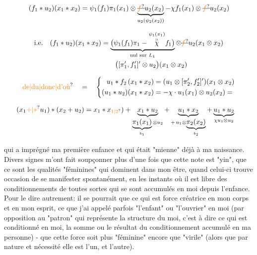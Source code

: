 \[
(f_1\ast u_2)(x_1\ast x_2)=
\psi_1(f_1)\pi_1(x_1)\otimes\underbrace{\deleted{\unsure{f}}u_2(x_2)}_{u_2(\psi_2(x_2))}
-\chi f_1(x_1)\otimes\deleted{\unsure{f}}u_2(x_2)
\]


\[
\begin{aligned}
\text{i.e.}\quad (f_1\ast u_2)(x_1\ast x_2)
 &=\underbrace{\big(\psi_1(f_1)\pi_1-\overset{\substack{\psi_1(\pi_1)\\ \shortparallel}}{\chi} f_1\big)}_{\text{nul sur } L_1}\otimes\deleted{\unsure{f}}u_2(x_1\otimes x_2)\\
 &\qquad\big([\pi'_1,f'_1]'\otimes u_2\big)(x_1\otimes x_2)
\end{aligned}
\]

\[
\text{\unsure{de|du|donc|d'où}}\quad =\quad\left\{\begin{aligned}
u_1\ast f_2\,(x_1\ast x_2)&=(u_1\otimes[\pi'_2,f'_2]')(x_1\otimes x_2)\\
(u_1\ast u_2)(x_1\ast x_2)&=-\chi\cdot u_1(x_1)\otimes u_2(x_2)=
\end{aligned}\right.
\]


\[
\begin{aligned}
(x_1\unsure{+|\ast}u_1)\ast(x_2+u_2)
&=x_1\ast x_{\unsure{1|2}})+
\underbrace{x_1\ast u_2}_{\underbrace{\pi_1(x_1)}_{b_1}\otimes u_2}
+\underbrace{u_1\ast x_2}_{+\,u_1\otimes\underbrace{\pi_2(x_2)}_{b_2}}
+\underbrace{u_1\ast u_2}_{\chi u_1\otimes u_2}
\end{aligned}
\]



qui a imprégné ma première enfance et qui était "mienne" déjà à ma naissance. Divers signes m'ont fait soupçonner plus d'une fois que cette note est "yin", que ce sont les qualités "féminines" qui dominent dans mon être, quand celui-ci trouve occasion de se manifester spontanément, en les instants où il est libre des conditionnements de toutes sortes qui se sont accumulés en moi depuis l'enfance. Pour le dire autrement: il se pourrait que ce qui est force créatrice en mon corps et en mon esprit, ce que j'ai appelé parfois "l'enfant" ou "l'ouvrier" en moi (par opposition au "patron" qui représente la structure du moi, c'est à dire ce qui est conditionné en moi, la somme ou le résultat du conditionnement accumulé en ma personne) - que cette force soit plus "féminine" encore que "virile" (alors que par nature et nécessité elle est l'un, et l'autre).

